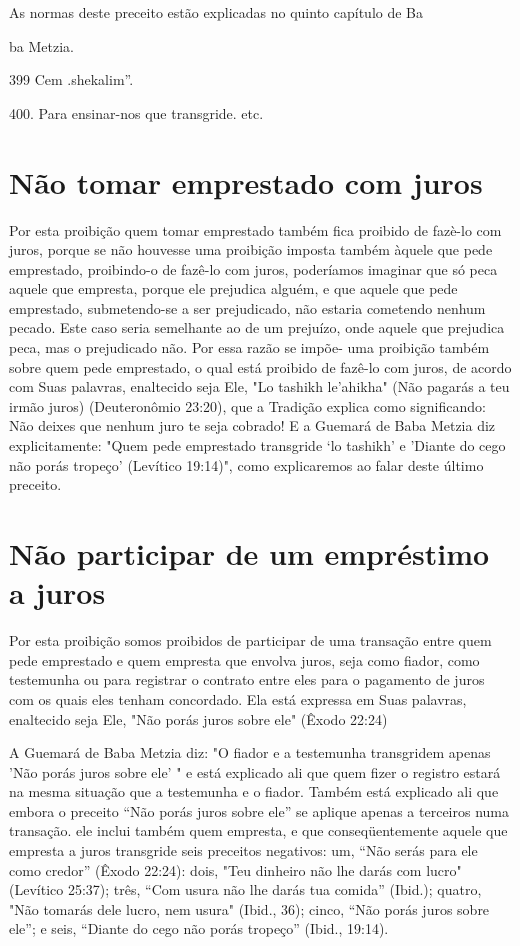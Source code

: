 As normas deste preceito estão explicadas no quinto capítulo de Ba


ba Metzia.

399 Cem .shekalim''.

400. Para ensinar-nos que transgride. etc.

\section{Não tomar emprestado com juros}

Por esta proibição quem tomar emprestado também fica proibido de fazè-lo
com juros, porque se não houvesse uma proibição imposta também àquele
que pede emprestado, proibindo-o de fazê-lo com juros, poderíamos
imaginar que só peca aquele que empresta, porque ele prejudica alguém, e
que aquele que pede emprestado, submetendo-se a ser prejudicado, não
estaria co­metendo nenhum pecado. Este caso seria semelhante ao de um
prejuízo, onde aquele que prejudica peca, mas o prejudicado não. Por
essa razão se impõe- uma proibição também sobre quem pede emprestado, o
qual está proibido de fazê-lo com juros, de acordo com Suas palavras,
enaltecido seja Ele, "Lo tashikh le'ahikha" (Não pagarás a teu irmão
juros) (Deuteronômio 23:20), que a Tradi­ção explica como significando:
Não deixes que nenhum juro te seja cobrado! E a Guemará de Baba Metzia
diz explicitamente: "Quem pede emprestado trans­gride `lo tashikh' e
'Diante do cego não porás tropeço' (Levítico 19:14)", como explicaremos
ao falar deste último preceito.

\section{Não participar de um empréstimo a juros}

Por esta proibição somos proibidos de participar de uma transação entre
quem pede emprestado e quem empresta que envolva juros, seja como
fiador, como testemunha ou para registrar o contrato entre eles para o
paga­mento de juros com os quais eles tenham concordado. Ela está
expressa em Suas palavras, enaltecido seja Ele, "Não porás juros sobre
ele" (Êxodo 22:24)

A Guemará de Baba Metzia diz: "O fiador e a testemunha transgri­dem
apenas 'Não porás juros sobre ele' " e está explicado ali que quem fizer
o registro estará na mesma situação que a testemunha e o fiador. Também
está explicado ali que embora o preceito ``Não porás juros sobre ele'' se
aplique apenas a terceiros numa transação. ele inclui também quem
empresta, e que conseqüentemente aquele que empresta a juros transgride
seis preceitos nega­tivos: um, ``Não serás para ele como credor'' (Êxodo
22:24): dois, "Teu dinhei­ro não lhe darás com lucro" (Levítico 25:37);
três, ``Com usura não lhe darás tua comida'' (Ibid.); quatro, "Não tomarás
dele lucro, nem usura" (Ibid., 36); cinco, ``Não porás juros sobre ele'';
e seis, ``Diante do cego não porás tropeço'' (Ibid., 19:14).

